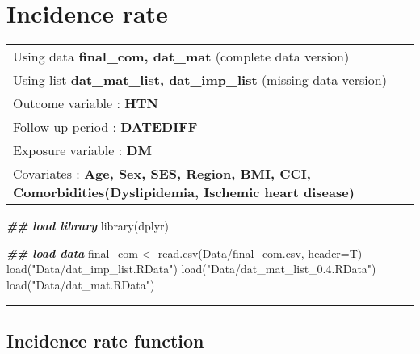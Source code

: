 \documentclass[
]{book}
\newenvironment{Shaded}{\begin{snugshade}}{\end{snugshade}}
\newcommand{\AttributeTok}[1]{\textcolor[rgb]{0.77,0.63,0.00}{#1}}
\newcommand{\DocumentationTok}[1]{\textcolor[rgb]{0.56,0.35,0.01}{\textbf{\textit{#1}}}}
\newcommand{\FunctionTok}[1]{\textcolor[rgb]{0.00,0.00,0.00}{#1}}
\newcommand{\NormalTok}[1]{#1}
\newcommand{\OtherTok}[1]{\textcolor[rgb]{0.56,0.35,0.01}{#1}}
\newcommand{\StringTok}[1]{\textcolor[rgb]{0.31,0.60,0.02}{#1}}
\begin{document}
\hypertarget{incidence-rate}{%
\chapter{Incidence rate}\label{incidence-rate}}

\begin{longtable}[]{@{}l@{}}
\toprule()
\endhead
Using data \textbf{final\_com, dat\_mat} (complete data version) \\
Using list \textbf{dat\_mat\_list, dat\_imp\_list} (missing data version) \\
Outcome variable : \textbf{HTN} \\
Follow-up period : \textbf{DATEDIFF} \\
Exposure variable : \textbf{DM} \\
Covariates : \textbf{Age, Sex, SES, Region, BMI, CCI, Comorbidities(Dyslipidemia, Ischemic heart disease)} \\
\bottomrule()
\end{longtable}

\begin{Shaded}
\begin{Highlighting}[]
\DocumentationTok{\#\# load library}
\FunctionTok{library}\NormalTok{(dplyr)}
\end{Highlighting}
\end{Shaded}

\begin{Shaded}
\begin{Highlighting}[]
\DocumentationTok{\#\# load data}
\NormalTok{final\_com }\OtherTok{\textless{}{-}} \FunctionTok{read.csv}\NormalTok{(}\StringTok{\textquotesingle{}Data/final\_com.csv\textquotesingle{}}\NormalTok{, }\AttributeTok{header=}\NormalTok{T)}
\FunctionTok{load}\NormalTok{(}\StringTok{"Data/dat\_imp\_list.RData"}\NormalTok{)}
\FunctionTok{load}\NormalTok{(}\StringTok{"Data/dat\_mat\_list\_0.4.RData"}\NormalTok{)}
\FunctionTok{load}\NormalTok{(}\StringTok{"Data/dat\_mat.RData"}\NormalTok{)}
\end{Highlighting}
\end{Shaded}

\begin{center}\rule{0.5\linewidth}{0.5pt}\end{center}

\hypertarget{incidence-rate-function}{%
\section{Incidence rate function}\label{incidence-rate-function}}
\end{document}
